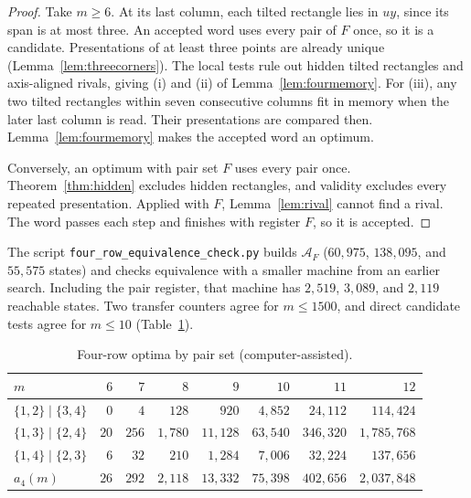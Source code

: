 \documentclass[12pt]{article}
\theoremstyle{plain}
\theoremstyle{definition}
\theoremstyle{remark}
\begin{document}
\begin{proof}
Take $m\ge6$. At its last column, each tilted rectangle lies in $uy$, since its span is at most three.
An accepted word uses every pair of $F$ once, so it is a candidate.
Presentations of at least three points are already unique
(Lemma~\ref{lem:threecorners}). The local tests rule out hidden
tilted rectangles and axis-aligned rivals, giving (i) and (ii) of
Lemma~\ref{lem:fourmemory}. For (iii), any two tilted rectangles within
seven consecutive columns fit in memory when the later last column is read.
Their presentations are compared then. Lemma~\ref{lem:fourmemory} makes the accepted word an optimum.

Conversely, an optimum with pair set $F$ uses every pair once. Theorem~\ref{thm:hidden} excludes hidden rectangles, and validity
excludes every repeated presentation. Applied with $F$,
Lemma~\ref{lem:rival} cannot find a rival. The word passes each step
and finishes with register $F$, so it is accepted.
\end{proof}

The script \nolinkurl{four_row_equivalence_check.py} builds $\mathcal A_F$
($60{,}975$, $138{,}095$, and $55{,}575$ states) and checks equivalence with
a smaller machine from an earlier search. Including the pair register,
that machine has $2{,}519$, $3{,}089$, and $2{,}119$ reachable states.
Two transfer counters agree for $m\le1500$, and direct candidate tests agree
for $m\le10$ (Table~\ref{tab:fourvalues}).

\begin{table}[!htb]
\centering\scriptsize\setlength{\tabcolsep}{4pt}
\begin{tabular}{@{}lrrrrrrr@{}}
\toprule
$m$ & $6$ & $7$ & $8$ & $9$ & $10$ & $11$ & $12$\\
\midrule
$\{1,2\}\mid\{3,4\}$ & $0$ & $4$ & $128$ & $920$ & $4{,}852$ & $24{,}112$ & $114{,}424$\\
$\{1,3\}\mid\{2,4\}$ & $20$ & $256$ & $1{,}780$ & $11{,}128$ & $63{,}540$ & $346{,}320$ & $1{,}785{,}768$\\
$\{1,4\}\mid\{2,3\}$ & $6$ & $32$ & $210$ & $1{,}284$ & $7{,}006$ & $32{,}224$ & $137{,}656$\\
$a_4(m)$ & $26$ & $292$ & $2{,}118$ & $13{,}332$ & $75{,}398$ & $402{,}656$ & $2{,}037{,}848$\\
\bottomrule
\end{tabular}
\caption{Four-row optima by pair set (computer-assisted).}
\label{tab:fourvalues}
\end{table}
\end{document}
